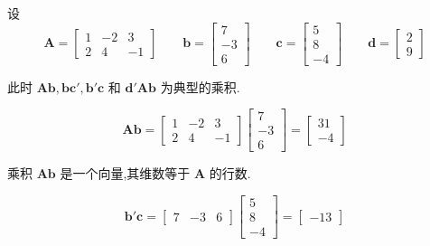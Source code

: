 设
\[
\bm{A} =
\begin{bmatrix}
1 & -2 & 3 \\
2 & 4 & -1
\end{bmatrix}
\qquad
\bm{b} =
\begin{bmatrix}
7 \\
-3 \\
6
\end{bmatrix}
\qquad
\bm{c} =
\begin{bmatrix}
5 \\
8 \\
-4
\end{bmatrix}
\qquad
\bm{d} =
\begin{bmatrix}
2 \\
9
\end{bmatrix}
\]

此时 $\bm{A}\bm{b},\bm{b}\bm{c}',\bm{b}'\bm{c}$ 和 $\bm{d}'\bm{A}\bm{b}$ 为典型的乘积.

\[
\bm{A}\bm{b} =
\begin{bmatrix}
1 & -2 & 3 \\
2 & 4 & -1
\end{bmatrix}
\begin{bmatrix}
7 \\
-3 \\
6
\end{bmatrix}
=
\begin{bmatrix}
31 \\
-4
\end{bmatrix}
\]

乘积 $\bm{A}\bm{b}$ 是一个向量,其维数等于 $\bm{A}$ 的行数.

\[
\bm{b}'\bm{c} =
\begin{bmatrix}
7 & -3 & 6
\end{bmatrix}
\begin{bmatrix}
5 \\
8 \\
-4
\end{bmatrix}
=
\begin{bmatrix}
-13
\end{bmatrix}
\]
